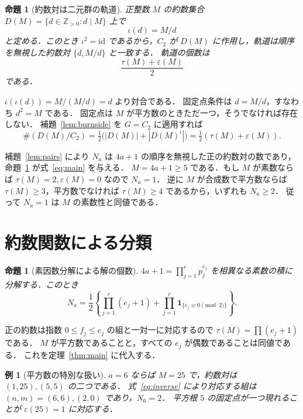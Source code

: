 \documentclass[a5paper,10pt,onecolumn]{jsarticle}
\makeatletter
\theoremstyle{mathnotetheorem}
\newtheorem{proposition}[theorem]{命題}
\newtheorem{example}[theorem]{例}
\renewcommand{\proofname}{証明}
\renewenvironment{proof}[1][\proofname]{%
  \par\pushQED{\qed}\normalfont\topsep4\p@\@plus2\p@\relax
  \trivlist\item[\hskip\labelsep\bfseries #1]\ignorespaces
}{\popQED\endtrivlist\@endpefalse}
\makeatother
\begin{document}
\begin{proposition}[約数対は二元群の軌道]\label{prop:orbit}
正整数 $M$ の約数集合 $D(M)=\{d\in\mathbb Z_{>0}:d\mid M\}$ 上で
\[
 \iota(d)=M/d
\]
と定める．このとき $\iota^2=\mathrm{id}$ であるから，$C_2$ が $D(M)$ に作用し，軌道は順序を無視した約数対 $\{d,M/d\}$ と一致する．
軌道の個数は
\[
 \frac{\tau(M)+\varepsilon(M)}2
\]
である．
\end{proposition}
\begin{proof}
$\iota(\iota(d))=M/(M/d)=d$ より対合である．
固定点条件は $d=M/d$，すなわち $d^2=M$ である．
固定点は $M$ が平方数のときただ一つ，そうでなければ存在しない．
補題~\ref{lem:burnside} を $G=C_2$ に適用すれば
\[
 \#(D(M)/C_2)
 =\tfrac12\bigl(|D(M)|+|D(M)^\iota|\bigr)
 =\tfrac12(\tau(M)+\varepsilon(M)).
\]
\end{proof}

\begin{proof}[定理~\ref{thm:main} の証明]
補題~\ref{lem:pairs} により $N_a$ は $4a+1$ の順序を無視した正の約数対の数であり，命題~\ref{prop:orbit} が式~\eqref{eq:main} を与える．
$M=4a+1\ge5$ である．もし $M$ が素数ならば $\tau(M)=2,\varepsilon(M)=0$ なので $N_a=1$．
逆に $M$ が合成数で平方数ならば $\tau(M)\ge3$，平方数でなければ $\tau(M)\ge4$ であるから，いずれも $N_a\ge2$．
従って $N_a=1$ は $M$ の素数性と同値である．
\end{proof}

\section{約数関数による分類}
\begin{proposition}[素因数分解による解の個数]\label{prop:factor}
$4a+1=\prod_{j=1}^r p_j^{e_j}$ を相異なる素数の積に分解する．このとき
\[
 N_a=\frac12\left\{\prod_{j=1}^r(e_j+1)
  +\prod_{j=1}^r\boldsymbol1_{\{e_j\equiv0\pmod2\}}\right\}.
\]
\end{proposition}
\begin{proof}
正の約数は指数 $0\le f_j\le e_j$ の組と一対一に対応するので $\tau(M)=\prod(e_j+1)$ である．
$M$ が平方数であることと，すべての $e_j$ が偶数であることは同値である．
これを定理~\ref{thm:main} に代入する．
\end{proof}

\begin{example}[平方数の特別な扱い]
$a=6$ ならば $M=25$ で，約数対は $(1,25),(5,5)$ の二つである．
式~\eqref{eq:inverse} により対応する組は $(n,m)=(6,6),(2,0)$ であり，$N_6=2$．
平方根 $5$ の固定点が一つ現れることが $\varepsilon(25)=1$ に対応する．
\end{example}
\end{document}
